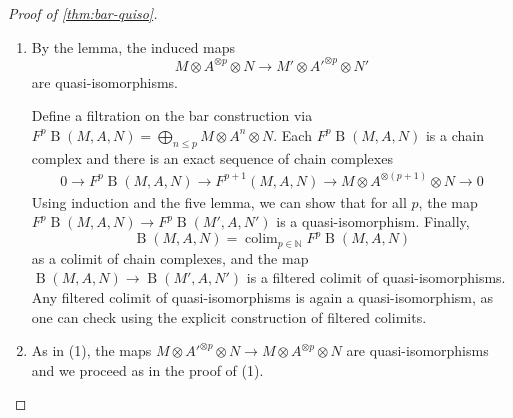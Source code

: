 \documentclass{scrartcl}
\theoremstyle{plain}
\newtheorem{theorem}{Theorem}[section]
\theoremstyle{definition}
\newcommand{\N}{\mathbb N}
\newcommand{\from}{\leftarrow}
\DeclareMathOperator{\colim}{colim}
\DeclareMathOperator{\BC}{B}
\newcommand{\comp}{\mathbin{\circ}}
\begin{document}
\begin{proof}[Proof of \cref{thm:bar-quiso}]
    \begin{enumerate}
        \item By the lemma, the induced maps $$M\otimes A^{\otimes p}\otimes N \to M'\otimes A'^{\otimes p}\otimes N'$$ are quasi-isomorphisms. 

Define a filtration on the bar construction via $F^p\BC(M, A, N) = \bigoplus_{n\leq p} M\otimes A^n\otimes N$. Each $F^p\BC(M, A, N)$ is a chain complex and there is an exact sequence of chain complexes
\begin{align*}
    0\to F^p\BC(M, A, N)\to F^{p+1}(M, A, N) \to M\otimes A^{\otimes(p+1)}\otimes N \to 0
\end{align*}
Using induction and the five lemma, we can show that for all $p$, the map $F^p\BC(M, A, N)\to F^p\BC(M', A, N')$ is a quasi-isomorphism. Finally, $$\BC(M, A, N)=\colim_{p\in \N} F^p\BC(M, A, N)$$ as a colimit of chain complexes, and the map $\BC(M, A, N)\to \BC(M', A, N')$ is a filtered colimit of quasi-isomorphisms. Any filtered colimit of quasi-isomorphisms is again a quasi-isomorphism, as one can check using the explicit construction of filtered colimits. 

\item As in (1), the maps $M\otimes A'^{\otimes p}\otimes N\to M\otimes A^{\otimes p}\otimes N$ are quasi-isomorphisms and we proceed as in the proof of (1). 
\end{enumerate}
\end{proof}


\end{document}
